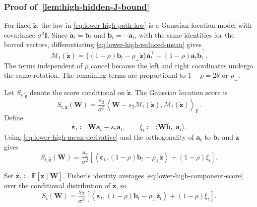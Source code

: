 \documentclass[11pt]{article}
\newcommand{\trans}{\top}
\begin{document}
\subsubsection{Proof of~\cref{lem:high-hidden-J-bound}}

For fixed $\widetilde{\bm z}$, the law in
\cref{eq:lower-high-path-law} is a Gaussian location model with covariance
$\sigma^2\bm I$.  Since $\dot{\bm a}_t=\bm b_t$ and
$\dot{\bm b}_t=-\bm a_t$, with the same identities for the barred vectors,
differentiating \cref{eq:lower-high-reduced-mean} gives
\begin{equation}
  \dot{\bm{\mathcal M}}_t(\widetilde{\bm z})
  =
  \{(1-\rho)\bm b_t-\rho_\perp\widetilde{\bm z}\}
  \overline{\bm a}_t^\trans
  +
  (1-\rho)\bm a_t\overline{\bm b}_t^\trans.
\label{eq:lower-high-mean-derivative}
\end{equation}
The terms independent of $\rho$ cancel because the left and right
coordinates undergo the same rotation.  The remaining terms are
proportional to $1-\rho=2\theta$ or $\rho_\perp$.

Let $S_{t,\widetilde{\bm z}}$ denote the score conditional on
$\widetilde{\bm z}$.  The Gaussian location score is
\[
  S_{t,\widetilde{\bm z}}(\bm W)
  =
  \frac{s_2}{\sigma^2}
  \left\langle
    \bm W-s_2\bm{\mathcal M}_t(\widetilde{\bm z}),
    \dot{\bm{\mathcal M}}_t(\widetilde{\bm z})
  \right\rangle_{\mathrm F}.
\]
Define
\begin{equation}
  \bm\varepsilon_t
  \coloneqq
  \bm W\overline{\bm a}_t-s_2\bm a_t,
  \qquad
  \xi_t
  \coloneqq
  \langle\bm W\overline{\bm b}_t,\bm a_t\rangle.
\label{eq:lower-high-epsilon-xi}
\end{equation}
Using \cref{eq:lower-high-mean-derivative} and the orthogonality of
$\bm a_t$ to $\bm b_t$ and $\widetilde{\bm z}$ gives
\begin{equation}
  S_{t,\widetilde{\bm z}}(\bm W)
  =
  \frac{s_2}{\sigma^2}
  \left[
    \left\langle
      \bm\varepsilon_t,
      (1-\rho)\bm b_t-\rho_\perp\widetilde{\bm z}
    \right\rangle
    +(1-\rho)\xi_t
  \right].
\label{eq:lower-high-component-score}
\end{equation}

Set
$\widehat{\bm z}_t\coloneqq
\mathbb E[\widetilde{\bm z}\mid\bm W]$.  Fisher's identity averages
\cref{eq:lower-high-component-score} over the conditional distribution of
$\widetilde{\bm z}$, so
\begin{equation}
  S_t(\bm W)
  =
  \frac{s_2}{\sigma^2}
  \left[
    \left\langle
      \bm\varepsilon_t,
      (1-\rho)\bm b_t-\rho_\perp\widehat{\bm z}_t
    \right\rangle
    +(1-\rho)\xi_t
  \right].
\label{eq:lower-high-mixture-score}
\end{equation}
\end{document}
